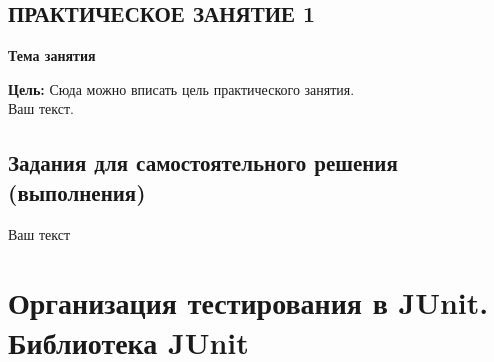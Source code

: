 \newpage%
\section*{ПРАКТИЧЕСКОЕ ЗАНЯТИЕ 1}%
 \vspace{-10pt}%
\begin{center}%
 {\bf%
 Тема занятия}
\end{center}%

{\bf Цель:} Сюда можно вписать цель практического занятия.
\\%

Ваш текст.

\newpage%
\section*{Задания для самостоятельного решения (выполнения)}%

Ваш текст

\newpage%

\newpage
\chapter{Организация тестирования в JUnit. Библиотека JUnit}
